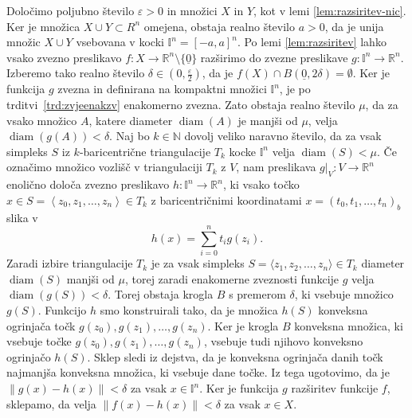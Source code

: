 \documentclass[mat1]{fmfdelo}
\newcommand{\R}{\mathbb R}
\newcommand{\N}{\mathbb N}
\DeclareMathOperator{\diam}{diam}
\newcommand{\I}{\mathbb I}
\newcommand{\0}{\underline{0}}
\begin{document}
\begin{dokaz}
Določimo poljubno število $\varepsilon > 0$ in množici $X$ in $Y$, kot v lemi \ref{lem:razsiritev-nic}. Ker je množica $X \cup Y \subset R^n$ omejena, obstaja realno število $a > 0$, da je unija množic $X \cup Y$ vsebovana v kocki $\I^n = \left [ -a, a \right ]^n$. Po lemi \ref{lem:razsiritev} lahko vsako zvezno preslikavo $f : X \to \R^n \setminus \{ \0 \}$ razširimo do zvezne preslikave $g : \I^n \to \R^n$. Izberemo tako realno število $\delta \in (0, \frac{\varepsilon}{2})$, da je $f(X) \cap B( \0, 2\delta) = \emptyset$. Ker je funkcija $g$ zvezna in definirana na kompaktni množici $\I^n$, je po trditvi~\ref{trd:zvjeenakzv} enakomerno zvezna. Zato obstaja realno število $\mu$, da za vsako množico $A$, katere diameter $\diam(A)$ je manjši od $\mu$, velja $\diam(g(A)) < \delta$. Naj bo $k \in \N$ dovolj veliko naravno število, da za vsak simpleks $S$ iz $k$-baricentrične triangulacije $T_k$ kocke $\I^n$ velja $\diam(S) < \mu$. Če označimo množico vozlišč v triangulaciji $T_k$ z $V$, nam preslikava $g|_V : V \to \R^n$ enolično določa zvezno preslikavo $h : \I^n \to \R^n$, ki vsako točko $x \in S = \left < z_0, z_1, \dots, z_n \right > \in T_k$ z baricentričnimi koordinatami $x = (t_0, t_1, \dots, t_n)_b$ slika v 
$$h(x) = \sum_{i=0}^n t_i g(z_i).$$
Zaradi izbire triangulacije $T_k$ je za vsak simpleks $S = \langle  z_1, z_2, \dots, z_n \rangle \in T_k$ diameter $\diam(S)$ manjši od $\mu$, torej zaradi enakomerne zveznosti funkcije $g$ velja $\diam (g(S)) < \delta$. Torej obstaja krogla $B$ s premerom $\delta$, ki vsebuje množico $g(S)$. Funkcijo $h$ smo konstruirali tako, da je množica $h(S)$ konveksna ogrinjača točk $g(z_0), g(z_1), \dots, g(z_n)$. Ker je krogla $B$ konveksna množica, ki vsebuje točke $g(z_0), g(z_1), \dots, g(z_n)$, vsebuje tudi njihovo konveksno ogrinjačo $h(S)$. Sklep sledi iz dejstva, da je konveksna ogrinjača danih točk najmanjša konveksna množica, ki vsebuje dane točke. Iz tega ugotovimo, da je $\| g(x) - h(x) \| < \delta$ za vsak $x \in \I^n$. Ker je funkcija $g$ razširitev funkcije $f$, sklepamo, da velja $\| f(x) - h(x) \| < \delta$ za vsak $x \in X$.


\end{dokaz}
\end{document}

